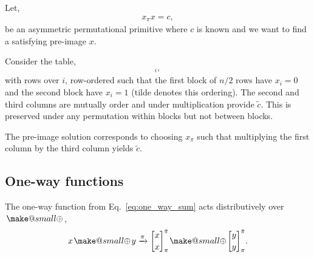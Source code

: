 \documentclass[twocolumn, aps, amsmath, amssymb, nofootinbib, superscriptaddress, longbibliography, doublefloatfix, table-of-contents, eqsecnum, rmp]{revtex4-2}
\makeatletter
\def\braid#1#2#3#4{\langle#1,#2\rangle_{#3}^{#4}}
\def\selfbraid#1#2#3{\langle#1\rangle_{#2}^{#3}}
\def\comm#1#2#3#4{[#1,#2]_{#3}^{#4}}
\newcommand{\stackbraid}[2]{{\genfrac{[}{]}{0pt}{}{{#1}}{{#2}}}^{\bar{\pi}}_{\pi}}
\newcommand{\soplus}{{{\hspace{1pt}}{\mathbin{\mathpalette\make@small{\mathbin\oplus}}}}{\hspace{1pt}}}
\newcommand{\make@small}[2]{%
  \vcenter{\hbox{%
    \scalebox{0.6}{$\m@th#1#2$}%
  }}%
}
\makeatother
\begin{document}

Let,
\begin{align}
	x_\pi x = c,
\end{align}
be an asymmetric permutational primitive where $c$ is known and we want to find a satisfying pre-image $x$.

Consider the table,
\begin{align}
	[x_\pi,\tilde{x},\tilde{x}\soplus \tilde{c}]_i,
\end{align}
with rows over $i$, row-ordered such that the first block of $n/2$ rows have $x_i=0$ and the second block have $x_i=1$ (tilde denotes this ordering). The second and third columns are mutually order and under multiplication provide $\tilde{c}$. This is preserved under any permutation within blocks but not between blocks.

The pre-image solution corresponds to choosing $x_\pi$ such that multiplying the first column by the third column yields $\tilde{c}$.

\subsection{One-way functions}

The one-way function from Eq.~\eqref{eq:one_way_sum} acts distributively over $\soplus$,
\begin{align}
	x\soplus y \xrightarrow{\pi} \stackbraid{x}{x} \soplus \stackbraid{y}{y}.
\end{align}

\end{document}
